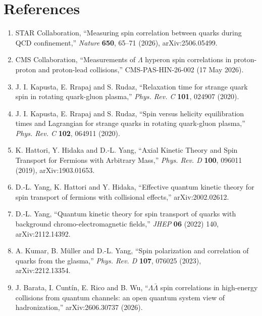 \documentclass[11pt]{article}
\begin{document}
\section*{References}
\begin{enumerate}[leftmargin=1.6em]
\item STAR Collaboration, ``Measuring spin correlation between quarks during QCD confinement,'' \emph{Nature} \textbf{650}, 65--71 (2026), arXiv:2506.05499.
\item CMS Collaboration, ``Measurements of $\Lambda$ hyperon spin correlations in proton-proton and proton-lead collisions,'' CMS-PAS-HIN-26-002 (17 May 2026).
\item J. I. Kapusta, E. Rrapaj and S. Rudaz, ``Relaxation time for strange quark spin in rotating quark-gluon plasma,'' \emph{Phys. Rev. C} \textbf{101}, 024907 (2020).
\item J. I. Kapusta, E. Rrapaj and S. Rudaz, ``Spin versus helicity equilibration times and Lagrangian for strange quarks in rotating quark-gluon plasma,'' \emph{Phys. Rev. C} \textbf{102}, 064911 (2020).
\item K. Hattori, Y. Hidaka and D.-L. Yang, ``Axial Kinetic Theory and Spin Transport for Fermions with Arbitrary Mass,'' \emph{Phys. Rev. D} \textbf{100}, 096011 (2019), arXiv:1903.01653.
\item D.-L. Yang, K. Hattori and Y. Hidaka, ``Effective quantum kinetic theory for spin transport of fermions with collisional effects,'' arXiv:2002.02612.
\item D.-L. Yang, ``Quantum kinetic theory for spin transport of quarks with background chromo-electromagnetic fields,'' \emph{JHEP} \textbf{06} (2022) 140, arXiv:2112.14392.
\item A. Kumar, B. M\"uller and D.-L. Yang, ``Spin polarization and correlation of quarks from the glasma,'' \emph{Phys. Rev. D} \textbf{107}, 076025 (2023), arXiv:2212.13354.
\item J. Barata, I. Cunt\'in, E. Rico and B. Wu, ``$\Lambda\bar\Lambda$ spin correlations in high-energy collisions from quantum channels: an open quantum system view of hadronization,'' arXiv:2606.30737 (2026).
\end{enumerate}
\end{document}
